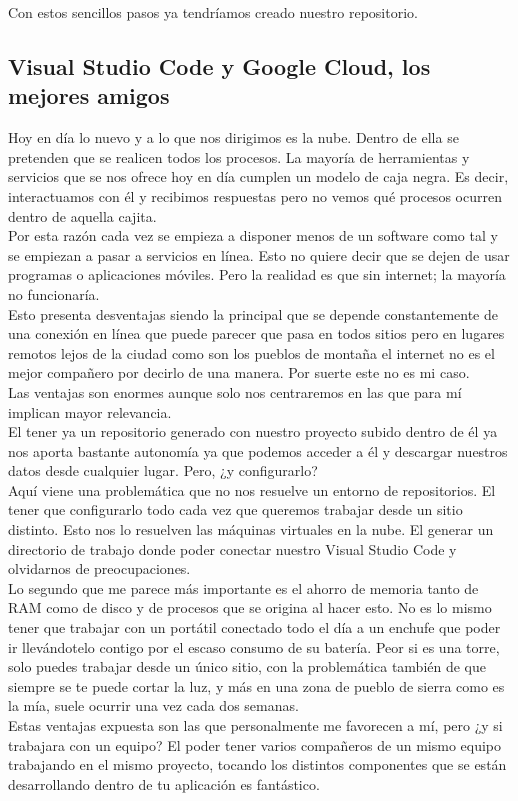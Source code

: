 Con estos sencillos pasos ya tendríamos creado nuestro repositorio.

\subsection{Visual Studio Code y Google Cloud, los mejores amigos}
Hoy en día lo nuevo y a lo que nos dirigimos es la nube. Dentro de ella se pretenden que se realicen todos los procesos. La mayoría de herramientas y servicios que se nos ofrece hoy en día cumplen un modelo de caja negra. Es decir, interactuamos con él y recibimos respuestas pero no vemos qué procesos ocurren dentro de aquella cajita.
\\Por esta razón cada vez se empieza a disponer menos de un software como tal y se empiezan a pasar a servicios en línea. Esto no quiere decir que se dejen de usar programas o aplicaciones móviles. Pero la realidad es que sin internet; la mayoría no funcionaría.
\\Esto presenta desventajas siendo la principal que se depende constantemente de una conexión en línea que puede parecer que pasa en todos sitios pero en lugares remotos lejos de la ciudad como son los pueblos de montaña el internet no es el mejor compañero por decirlo de una manera. Por suerte este no es mi caso.
\\Las ventajas son enormes aunque solo nos centraremos en las que para mí implican mayor relevancia.
\\El tener ya un repositorio generado con nuestro proyecto subido dentro de él ya nos aporta bastante autonomía ya que podemos acceder a él y descargar nuestros datos desde cualquier lugar. Pero, ¿y configurarlo?
\\Aquí viene una problemática que no nos resuelve un entorno de repositorios. El tener que configurarlo todo cada vez que queremos trabajar desde un sitio distinto. Esto nos lo resuelven las máquinas virtuales en la nube. El generar un directorio de trabajo donde poder conectar nuestro Visual Studio Code y olvidarnos de preocupaciones.
\\Lo segundo que me parece más importante es el ahorro de memoria tanto de RAM como de disco y de procesos que se origina al hacer esto. No es lo mismo tener que trabajar con un portátil conectado todo el día a un enchufe que poder ir llevándotelo contigo por el escaso consumo de su batería. Peor si es una torre, solo puedes trabajar desde un único sitio, con la problemática también de que siempre se te puede cortar la luz, y más en una zona de pueblo de sierra como es la mía, suele ocurrir una vez cada dos semanas.
\\Estas ventajas expuesta son las que personalmente me favorecen a mí, pero ¿y si trabajara con un equipo? El poder tener varios compañeros de un mismo equipo trabajando en el mismo proyecto, tocando los distintos componentes que se están desarrollando dentro de tu aplicación es fantástico.

